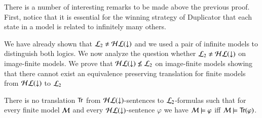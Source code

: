 There is a number of interesting remarks to be made above the
previous proof. First, notice that it is essential for the winning
strategy of Duplicator that each state in a model is related to
infinitely many others.


We have already shown that $\mathcal{L}_2 \not= \mathcal{HL}({\downarrow})$ and we used a
pair of infinite models to distinguish both logics. We now analyze
the question whether $\mathcal{L}_2 \not= \mathcal{HL}({\downarrow})$ on image-finite models.
We prove that $\mathcal{HL}({\downarrow}) \not \leq \mathcal{L}_2$ on image-finite models
showing that there cannot exist an equivalence preserving
translation for finite models from $\mathcal{HL}({\downarrow})$ to $\mathcal{L}_2$


\begin{thm}
There is no translation ${\sf Tr}$ from $\mathcal{HL}({\downarrow})$-sentences to
$\mathcal{L}_2$-formulas such that for every finite model $\mathcal{M}$ and
every $\mathcal{HL}({\downarrow})$-sentence $\varphi$ we have $\mathcal{M} \models
\varphi$ iff $\mathcal{M} \models {\sf Tr}(\varphi)$.
\end{thm}
